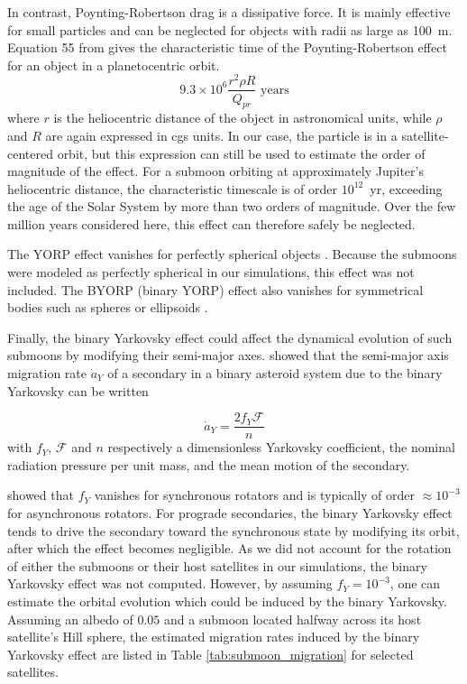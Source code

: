 \documentclass{aa}
\begin{document}
\begin{appendix}
In contrast, Poynting-Robertson drag is a dissipative force. It is mainly effective for small particles and can be neglected for objects with radii as large as 100~m. Equation 55 from \cite{BURNS1979} gives the characteristic time of the Poynting-Robertson effect for an object in a planetocentric orbit. 
\begin{equation}
    9.3\times10^6 \frac{r^2\rho R}{Q_{pr}} \text{ years}
\end{equation}
where $r$ is the heliocentric distance of the object in astronomical units, while $\rho$ and $R$ are again expressed in cgs units.
In our case, the particle is in a satellite-centered orbit, but this expression can still be used to estimate the order of magnitude of the effect. For a submoon orbiting at approximately Jupiter's heliocentric distance, the characteristic timescale is of order $10^{12}$~yr, exceeding the age of the Solar System by more than two orders of magnitude. Over the few million years considered here, this effect can therefore safely be neglected.

The YORP effect vanishes for perfectly spherical objects \citep{Breiter_2008}. Because the submoons were modeled as perfectly spherical in our simulations, this effect was not included. The BYORP (binary YORP) effect also vanishes for symmetrical bodies such as spheres or ellipsoids \citep{Jacobson_2011}.

Finally, the binary Yarkovsky effect could affect the dynamical evolution of such submoons by modifying their semi-major axes. \cite{Zhou_2024} showed that the semi-major axis migration rate $\dot{a}_Y$ of a secondary in a binary asteroid system due to the binary Yarkovsky can be written  

\begin{equation}
    \dot{a}_Y= \frac{2f_Y\mathcal{F}}{n}
\end{equation}
with $f_Y$, $\mathcal{F}$ and $n$ respectively a dimensionless Yarkovsky coefficient, the nominal radiation pressure per unit mass, and the mean motion of the secondary.

\cite{Zhou_2024} showed that $f_Y$ vanishes for synchronous rotators and is typically of order $\approx10^{-3}$ for asynchronous rotators. For prograde secondaries, the binary Yarkovsky effect tends to drive the secondary toward the synchronous state by modifying its orbit, after which the effect becomes negligible. As we did not account for the rotation of either the submoons or their host satellites in our simulations, the binary Yarkovsky effect was not computed. However, by assuming $f_Y =10^{-3}$, one can estimate the orbital evolution which could be induced by the binary Yarkovsky. Assuming an albedo of $0.05$ and a submoon located halfway across its host satellite's Hill sphere, the estimated migration rates induced by the binary Yarkovsky effect are listed in Table \ref{tab:submoon_migration} for selected satellites.


\end{appendix}
\end{document}
